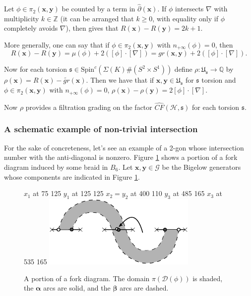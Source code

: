\documentclass[11pt]{article}
\theoremstyle{plain} \newtheorem{thm}{Theorem}[subsection]
\theoremstyle{plain} \newtheorem{cor}[thm]{Corollary}
\theoremstyle{plain} \newtheorem{prop}[thm]{Proposition}
\theoremstyle{plain} \newtheorem{conj}[thm]{Conjecture}
\theoremstyle{plain} \newtheorem{lem}[thm]{Lemma}
\theoremstyle{definition} \newtheorem{df}[thm]{Definition}
\theoremstyle{remark} \newtheorem{rmk}[thm]{Remark}
\theoremstyle{remark} \newtheorem{obs}[thm]{Observation}
\newcommand{\B}[1]{B_{#1} }
\newcommand{\DBCs}[1]{\Sigma(#1)\#(S^{2}\times S^{1})}
\newcommand{\G}{\mathcal{G}}
\newcommand{\h}{\mathcal{H}}
\newcommand{\tld}[1]{\widetilde{#1}}
\newcommand{\Us}{\mathfrak{U}_{\mathfrak{s}}}
\newcommand{\ba}{\boldsymbol{\alpha}}
\newcommand{\bb}{\boldsymbol{\beta}}
\newcommand{\bx}{\mathbf{x}}
\newcommand{\by}{\mathbf{y}}
\newcommand{\AD}{\nabla}
\begin{document}
Let $\phi \in \pi_{2}(\bx , \by)$ be counted by a term in $\widehat{\partial}(\bx)$.  If $\phi$ intersects $\AD$ with multiplicity $k \in \mathbb{Z}$ (it can be arranged that $k \geq 0$, with equality only if $\phi$ completely avoids $\AD$), then \cite{ss:R2} gives that $R(\bx) - R(\by) = 2k + 1$.

More generally, one can say that if $\phi \in \pi_{2}(\bx , \by)$ with $n_{+\infty}(\phi) = 0$, then
\begin{equation*}
R(\bx) - R(\by) = \mu(\phi) + 2\left( [\phi]\cdot[\AD] \right)= gr(\bx, \by) + 2\left( [\phi]\cdot[\AD]\right).
\end{equation*}

Now for each torsion $\mathfrak{s} \in \text{Spin}^{c}(\DBCs{K})$ define $\rho: \Us \rightarrow \mathbb{Q}$ by $\rho(\bx) = R(\bx) - \tld{gr}(\bx)$.
Then we have that if $\bx, \by \in \Us$ for $\mathfrak{s}$ torsion and $\phi \in \pi_{2}(\bx , \by)$ with $n_{+\infty}(\phi) = 0$, $\rho(\bx) - \rho(\by) = 2[\phi]\cdot[\AD]$.

Now $\rho$ provides a filtration grading on the factor $\widehat{CF}(\h, \mathfrak{s})$ for each torsion $\mathfrak{s}$.

\subsubsection{A schematic example of non-trivial intersection}

For the sake of concreteness, let's see an example of a 2-gon whose intersection number with the anti-diagonal is nonzero.  Figure \ref{fig:ADfork} shows a portion of a fork diagram induced by some braid in $\B{6}$.  Let $\bx, \by \in \G$ be the Bigelow generators whose components are indicated in Figure \ref{fig:ADfork}.

\begin{figure}[h!]
\centering
{}
\small
\pinlabel* $x_{1}$ at 75 125
\pinlabel* $y_{1}$ at 125 125
\pinlabel* $x_{2}=y_{2}$ at 400 110
\pinlabel* $y_{3}$ at 485 165
\pinlabel* $x_{3}$ at 535 165
\endlabellist
\includegraphics[height = 35mm]{ADfork}
\caption[A fork diagram depicting non-trivial intersection with $\AD$]{A portion of a fork diagram.  The domain $\pi(\mathcal{D}(\phi))$ is shaded, the $\ba$ arcs are solid, and the $\bb$ arcs are dashed.\label{fig:ADfork}}
\end{figure}
\end{document}
